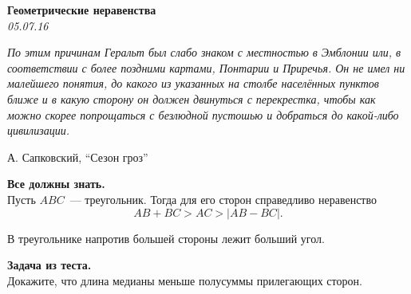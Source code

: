 \begin{center}
\textbf{\Large Геометрические неравенства}\\
\textit{05.07.16}
\end{center}

\epigraph{\textit{По этим причинам Геральт был слабо знаком с местностью в Эмблонии или, в соответствии с более поздними картами, Понтарии и Приречья. Он не имел ни малейшего понятия, до какого из указанных на столбе населённых пунктов ближе и в какую сторону он должен двинуться с перекрестка, чтобы как можно скорее попрощаться с безлюдной пустошью и добраться до какой-либо цивилизации.}}{А. Сапковский, ``Сезон гроз''}

{\bf Все должны знать.} \\
Пусть  $ABC$~--- треугольник. Тогда для его сторон справедливо неравенство $$AB+BC > AC >|AB-BC|.$$

В треугольнике напротив большей стороны лежит больший угол.

{\bf Задача из теста.}\\
Докажите, что длина медианы меньше полусуммы прилегающих сторон.

